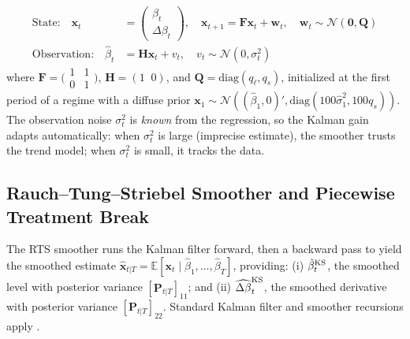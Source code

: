 \documentclass[12pt]{article}
\begin{document}
\begin{align}
\text{State:} \quad \mathbf{x}_t &= \begin{pmatrix} \beta_t \\ \Delta\beta_t \end{pmatrix}, \quad
\mathbf{x}_{t+1} = \mathbf{F} \mathbf{x}_t + \mathbf{w}_t, \quad \mathbf{w}_t \sim \mathcal{N}(\mathbf{0}, \mathbf{Q}) \label{eq:transition} \\
\text{Observation:} \quad \hat{\beta}_t &= \mathbf{H} \mathbf{x}_t + v_t, \quad v_t \sim \mathcal{N}(0, \sigma^2_t) \label{eq:obs}
\end{align}
where $\mathbf{F} = \bigl(\begin{smallmatrix} 1 & 1 \\ 0 & 1 \end{smallmatrix}\bigr)$, $\mathbf{H} = (1 \;\; 0)$, and $\mathbf{Q} = \text{diag}(q_\ell, q_s)$, initialized at the first period of a regime with a diffuse prior $\mathbf{x}_1 \sim \mathcal{N}((\hat{\beta}_1, 0)', \text{diag}(100\hat{\sigma}^2_1, 100 q_s))$. The observation noise $\sigma^2_t$ is \emph{known} from the regression, so the Kalman gain adapts automatically: when $\sigma^2_t$ is large (imprecise estimate), the smoother trusts the trend model; when $\sigma^2_t$ is small, it tracks the data.

\subsection{Rauch--Tung--Striebel Smoother and Piecewise Treatment Break}\label{sec:rts}

The RTS smoother runs the Kalman filter forward, then a backward pass to yield the smoothed estimate $\hat{\mathbf{x}}_{t|T} = \mathbb{E}[\mathbf{x}_t \mid \hat{\beta}_1, \ldots, \hat{\beta}_T]$, providing: (i) $\hat{\beta}^{\rm KS}_t$, the smoothed level with posterior variance $[\mathbf{P}_{t|T}]_{11}$; and (ii) $\widehat{\Delta\beta}^{\rm KS}_t$, the smoothed derivative with posterior variance $[\mathbf{P}_{t|T}]_{22}$. Standard Kalman filter and smoother recursions apply \citep{durbin2012time}.
\end{document}
